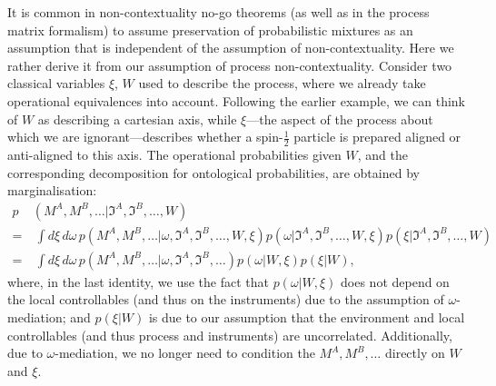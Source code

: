 \documentclass[a4paper,onecolumn,11pt,accepted=2018-05-04]{quantumarticle}
\begin{document}
It is common in non-contextuality no-go theorems (as well as in the process matrix formalism) to assume preservation of probabilistic mixtures as an assumption that is independent of the assumption of non-contextuality. Here we rather derive it from our assumption of process non-contextuality. Consider two classical variables  $\xi$, $W$ used to describe the process, where we already take operational equivalences into account. Following the earlier example, we can think of $W$ as describing a cartesian axis, while $\xi$---the aspect of the process about which we are ignorant---describes whether a spin-$\frac{1}{2}$ particle is prepared aligned or anti-aligned to this axis. The operational probabilities given $W$, and the corresponding decomposition for ontological probabilities, are obtained by marginalisation:
\begin{align}\label{marginalprocess}
p&(M^A,M^B,\dots|\mathfrak{I}^A, \mathfrak{I}^B,\dots, W)\\ \nonumber
=&~\int\! d\xi\,d\omega\, p(M^A,M^B,\dots|\omega, \mathfrak{I}^A, \mathfrak{I}^B,\dots, W,\xi)p(\omega| \mathfrak{I}^A, \mathfrak{I}^B,\dots,W, \xi)p(\xi|\mathfrak{I}^A, \mathfrak{I}^B,\dots,W)\\ \nonumber
=&~\int\! d\xi\,d\omega\, p(M^A,M^B,\dots|\omega, \mathfrak{I}^A, \mathfrak{I}^B,\dots)p(\omega | W, \xi) p(\xi|W),
\end{align}
where, in the last identity, we use the fact that $p(\omega | W, \xi)$ does not depend on the local controllables (and thus on the instruments) due to the assumption of $\omega$-mediation; and $p(\xi|W)$ is due to our assumption that the environment and local controllables (and thus process and instruments) are uncorrelated. Additionally, due to $\omega$-mediation, we no longer need to condition the $M^A,M^B,\dots$ directly on $W$ and $\xi$.
\end{document}
